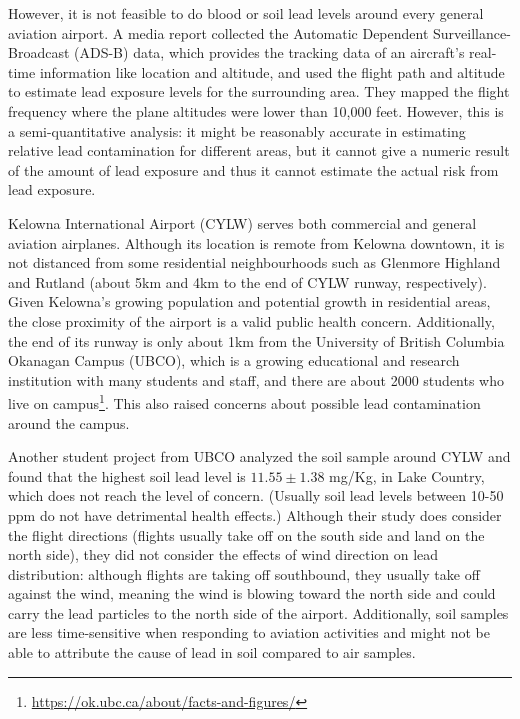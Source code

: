 \documentclass[12pt]{article}
\begin{document}
 However, it is not feasible to do blood or soil lead levels around every general aviation airport. A media report collected the Automatic Dependent Surveillance-Broadcast (ADS-B) data, which provides the tracking data of an aircraft's real-time information like location and altitude, and used the flight path and altitude to estimate lead exposure levels for the surrounding area. They mapped the flight frequency where the plane altitudes were lower than 10,000 feet. \cite{noauthor_you_2022} However, this is a semi-quantitative analysis: it might be reasonably accurate in estimating relative lead contamination for different areas, but it cannot give a numeric result of the amount of lead exposure and thus it cannot estimate the actual risk from lead exposure. 

Kelowna International Airport (CYLW) serves both commercial and general aviation airplanes. Although its location is remote from Kelowna downtown, it is not distanced from some residential neighbourhoods such as Glenmore Highland and Rutland (about 5km and 4km to the end of CYLW runway, respectively). Given Kelowna's growing population and potential growth in residential areas, the close proximity of the airport is a valid public health concern. Additionally, the end of its runway is only about 1km from the University of British Columbia Okanagan Campus (UBCO), which is a growing educational and research institution with many students and staff, and there are about 2000 students who live on campus\footnote{\url{https://ok.ubc.ca/about/facts-and-figures/}}. This also raised concerns about possible lead contamination around the campus.

Another student project from UBCO analyzed the soil sample around CYLW and found that the highest soil lead level is $11.55\pm 1.38$ mg/Kg, in Lake Country, which does not reach the level of concern. \cite{harrison_lead_nodate} (Usually soil lead levels between 10-50 ppm do not have detrimental health effects.) \cite{noauthor_lead_nodate} Although their study does consider the flight directions (flights usually take off on the south side and land on the north side), they did not consider the effects of wind direction on lead distribution: although flights are taking off southbound, they usually take off against the wind, meaning the wind is blowing toward the north side and could carry the lead particles to the north side of the airport. \cite{harrison_lead_nodate} Additionally, soil samples are less time-sensitive when responding to aviation activities and might not be able to attribute the cause of lead in soil compared to air samples. 
\end{document}
